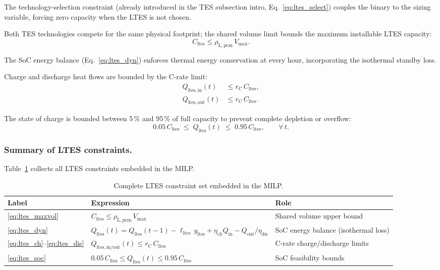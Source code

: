 \documentclass[11pt,a4paper]{report}
\begin{document}
The technology-selection constraint (already introduced in the TES subsection
intro, Eq.~\eqref{eq:ltes_select}) couples the binary to the sizing variable,
forcing zero capacity when the LTES is not chosen.

Both TES technologies compete for the same physical footprint; the shared volume
limit bounds the maximum installable LTES capacity:
\begin{equation}
    C_\mathrm{ltes} \leq \rho_\mathrm{L,pcm}\,V_\mathrm{max}.
    \label{eq:ltes_maxvol}
\end{equation}

The SoC energy balance (Eq.~\eqref{eq:ltes_dyn}) enforces thermal energy
conservation at every hour, incorporating the isothermal standby loss.

Charge and discharge heat flows are bounded by the C-rate limit:
\begin{align}
    Q_\mathrm{ltes,in}(t)  &\leq r_\mathrm{C}\,C_\mathrm{ltes}, \label{eq:ltes_ch} \\
    Q_\mathrm{ltes,out}(t) &\leq r_\mathrm{C}\,C_\mathrm{ltes}. \label{eq:ltes_dis}
\end{align}

The state of charge is bounded between 5\,\% and 95\,\% of full capacity to
prevent complete depletion or overflow:
\begin{equation}
    0.05\,C_\mathrm{ltes} \;\leq\; Q_\mathrm{ltes}(t) \;\leq\; 0.95\,C_\mathrm{ltes},
    \qquad \forall\,t.
    \label{eq:ltes_soc}
\end{equation}

\subsubsection{Summary of LTES constraints.}

Table~\ref{tab:ltes_summary} collects all LTES constraints embedded in the MILP.

\begin{table}[H]
\centering
\caption{Complete LTES constraint set embedded in the MILP.}
\label{tab:ltes_summary}
\begin{tabular}{llp{5.5cm}}
\hline
\textbf{Label} & \textbf{Expression} & \textbf{Role} \\
\hline
\eqref{eq:ltes_maxvol}
    & $C_\mathrm{ltes} \leq \rho_\mathrm{L,pcm}\,V_\mathrm{max}$
    & Shared volume upper bound \\
\eqref{eq:ltes_dyn}
    & $Q_\mathrm{ltes}(t) = Q_\mathrm{ltes}(t-1) - \ell_\mathrm{ltes}\,y_\mathrm{ltes} + \eta_\mathrm{ch}Q_\mathrm{in} - Q_\mathrm{out}/\eta_\mathrm{dis}$
    & SoC energy balance (isothermal loss) \\
\eqref{eq:ltes_ch}--\eqref{eq:ltes_dis}
    & $Q_\mathrm{ltes,in/out}(t) \leq r_\mathrm{C}\,C_\mathrm{ltes}$
    & C-rate charge/discharge limits \\
\eqref{eq:ltes_soc}
    & $0.05\,C_\mathrm{ltes} \leq Q_\mathrm{ltes}(t) \leq 0.95\,C_\mathrm{ltes}$
    & SoC feasibility bounds \\
\hline
\end{tabular}
\end{table}
\end{document}
